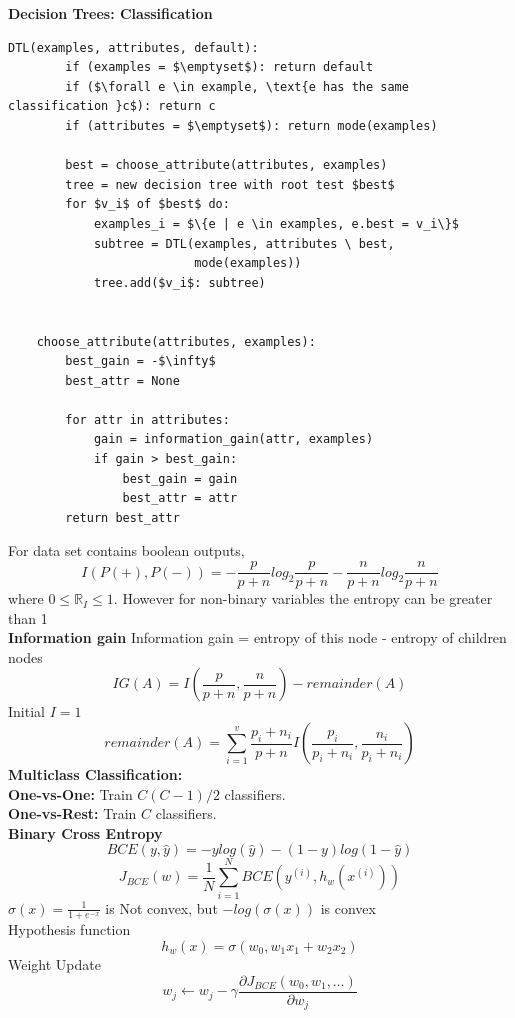 \documentclass[8pt,twocolumn]{article}
\begin{document}
\vspace{-0.6em}
\textbf{Decision Trees: Classification}\vspace{-0.6em}
\begin{lstlisting}[mathescape=true]
    DTL(examples, attributes, default):
        if (examples = $\emptyset$): return default
        if ($\forall e \in example, \text{e has the same classification }c$): return c
        if (attributes = $\emptyset$): return mode(examples)

        best = choose_attribute(attributes, examples)
        tree = new decision tree with root test $best$
        for $v_i$ of $best$ do:
            examples_i = $\{e | e \in examples, e.best = v_i\}$
            subtree = DTL(examples, attributes \ best, 
                          mode(examples))
            tree.add($v_i$: subtree)


    choose_attribute(attributes, examples):
        best_gain = -$\infty$
        best_attr = None
    
        for attr in attributes:
            gain = information_gain(attr, examples)
            if gain > best_gain:
                best_gain = gain
                best_attr = attr
        return best_attr
    \end{lstlisting}\vspace{-0.6em}
    For data set contains boolean outputs, 
    \[I(P(+), P(-)) = -\frac{p}{p + n}log_2 \frac{p}{p + n} - \frac{n}{p+n}log_2\frac{n}{p+n}\]
    where $0 \leq \mathbb{R}_I \leq 1$. However for non-binary variables the entropy can be greater than 1\\
    \textbf{Information gain}
    Information gain = entropy of this node - entropy of children nodes
    \[IG(A) = I(\frac{p}{p + n}, \frac{n}{p + n}) - remainder(A)\] Initial $I = 1$
    \[remainder(A) = \sum_{i=1}^{v}\frac{p_i + n_i}{p + n}I(\frac{p_i}{p_i + n_i}, \frac{n_i}{p_i + n_i})\]
\textbf{Multiclass Classification:}\\
\textbf{One-vs-One:} Train $C(C-1)/2$ classifiers.\\
\textbf{One-vs-Rest:} Train $C$ classifiers.\\
\textbf{Binary Cross Entropy}
\[BCE(y, \hat{y}) = -ylog(\hat{y}) - (1 - y)log(1 - \hat{y})\]
\[J_{BCE}(w) = \frac{1}{N} \sum_{i=1}^{N} BCE(y^{(i)}, h_w(x^{(i)}))\]
$\sigma(x) = \frac{1}{1 + e^{-x}}$ is Not convex, but
$-log(\sigma(x))$ is convex\\
Hypothesis function
\[h_w(x) = \sigma(w_0, w_1 x_1 + w_2 x_2) \]
Weight Update
\[w_j \leftarrow w_j - \gamma \frac{\partial J_{BCE}(w_0, w_1, \dots)}{\partial w_j}\]
\end{document}
